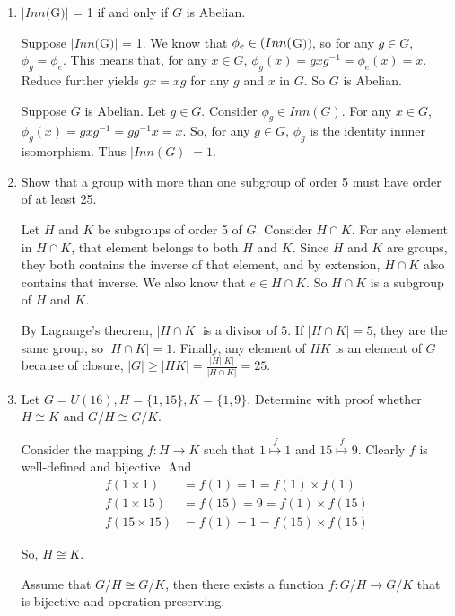 \documentclass[12pt]{article}
\begin{document}
\begin{enumerate}
    \item $|Inn($G$)|$ = 1 if and only if $G$ is Abelian.

        Suppose $|Inn($G$)|$ = 1. We know that $\phi_e \in \text(Inn($G$))$, so for any $g \in G$, $\phi_g = \phi_e$. This means that, for any $x \in G$, $\phi_g(x) = gxg^{-1} = \phi_e(x) = x$. Reduce further yields $gx = xg$ for any $g$ and $x$ in $G$. So $G$ is Abelian.

        Suppose $G$ is Abelian. Let $g \in G$. Consider $\phi_g \in Inn(G)$. For any $x \in G$, $\phi_g(x) = gxg^{-1} = gg^{-1}x = x$. So, for any $g\in G$, $\phi_g$ is the identity innner isomorphism. Thus $|Inn(G)| = 1$.
        \pagebreak

    \item Show that a group with more than one subgroup of order 5 must have order of at least 25.

        Let $H$ and $K$ be subgroups of order 5 of $G$.
        Consider $H \cap K$. For any element in $H \cap K$, that element belongs to both $H$ and $K$. Since $H$ and $K$ are groups, they both contains the inverse of that element, and by extension, $H \cap K$ also contains that inverse. We also know that $e \in H\cap K$. So $H \cap K$ is a subgroup of $H$ and $K$.

        By Lagrange's theorem, $|H\cap K|$ is a divisor of $5$. If $|H\cap K| = 5$, they are the same group, so $|H \cap K| = 1$.
        Finally, any element of $HK$ is an element of $G$ because of closure, $|G| \geq |HK| = \frac{|H||K|}{|H\cap K|} = 25$.
        \pagebreak

    \item Let $G = U(16), H = \{1, 15\}, K = \{1,9\}$. Determine with proof whether $H \cong K$ and $G/H \cong G/K$.

        Consider the mapping $f: H \to K$ such that $1 \overset{f}{\mapsto} 1$ and $15 \overset{f}{\mapsto} 9$. Clearly $f$ is well-defined and bijective.
        And
        \begin{align*}
            f(1 \times 1) &= f(1) = 1 = f(1) \times f(1) \\
            f(1 \times 15) &= f(15) = 9 = f(1) \times f(15)\\
            f(15 \times 15) &= f(1) = 1 = f(15) \times f(15)
        \end{align*}

        So, $H \cong K$.

        Assume that $G/H \cong G/K$, then there exists a function $f: G/H \to G/K$ that is bijective and operation-preserving.


\end{enumerate}
\end{document}
